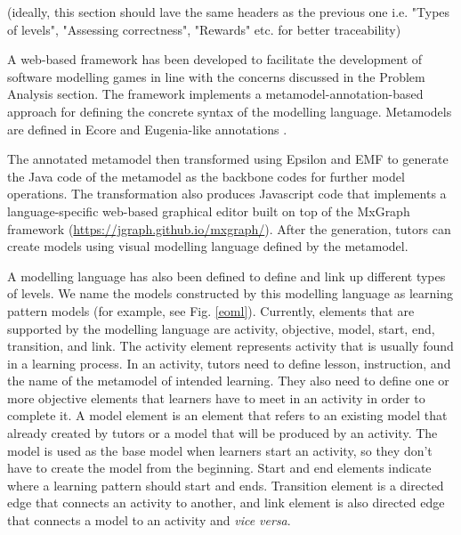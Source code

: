\documentclass[conference]{IEEEtran}
\begin{document}
(ideally, this section should lave the same headers as the previous one i.e. "Types of levels", "Assessing correctness", "Rewards" etc. for better traceability)

A web-based framework has been developed to facilitate the development of software modelling games in line with the concerns discussed in the Problem Analysis section. The framework implements a metamodel-annotation-based approach for defining the concrete syntax of the modelling language. Metamodels are defined in Ecore and Eugenia-like annotations \cite{kolovos2015eugenia}. 

The annotated metamodel then transformed using Epsilon \cite{kolovos2010epsilon} and EMF \cite{steinberg2008emf} to generate the Java code of the metamodel as the backbone codes for further model operations. The transformation also produces Javascript code that implements a language-specific web-based graphical editor built on top of the MxGraph framework (\url{https://jgraph.github.io/mxgraph/}). After the generation, tutors can create models using visual modelling language defined by the metamodel.

A modelling language has also been defined to define and link up different types of levels. We name the models constructed by this modelling language as learning pattern models (for example, see Fig. \ref{eoml}). Currently, elements that are supported by the modelling language are activity, objective, model, start, end, transition, and link. The activity element represents activity that is usually found in a learning process. In an activity, tutors need to define lesson, instruction, and the name of the metamodel of intended learning. They also need to define one or more objective elements that learners have to meet in an activity in order to complete it. A model element is an element that refers to an existing model that already created by tutors or a model that will be produced by an activity. The model is used as the base model when learners start an activity, so they don't have to create the model from the beginning. Start and end elements indicate where a learning pattern should start and ends. Transition element is a directed edge that connects an activity to another, and link element is also directed edge that connects a model to an activity and \textit{vice versa}.

\end{document}
